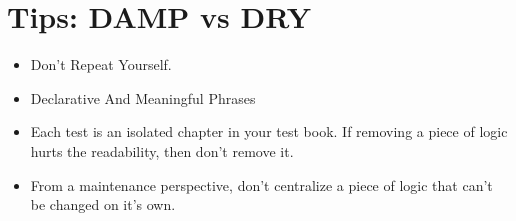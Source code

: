 \documentclass{article}
\begin{document}
\sloppy
\section{Tips: DAMP vs DRY}
\begin{itemize}
    \item Don't Repeat Yourself.
    \item Declarative And Meaningful Phrases
    \item Each test is an isolated chapter in your test book. If removing a
        piece of logic hurts the readability, then don't remove it.
    \item From a maintenance perspective, don't centralize a piece of logic that
        can't be changed on it's own.
\end{itemize}
\end{document}
